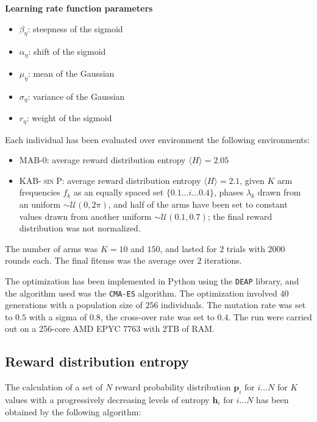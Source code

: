 \noindent \textbf{Learning rate function parameters}
\begin{itemize}
    \item $\beta_{\eta}$: steepness of the sigmoid
    \item $\alpha_{\eta}$: shift of the sigmoid
    \item $\mu_{\eta}$: mean of the Gaussian
    \item $\sigma_{\eta}$: variance of the Gaussian
    \item $r_{\eta}$: weight of the sigmoid
\end{itemize}

\noindent Each individual has been evaluated over environment the following environments:

\begin{itemize}
    \item \textsc{MAB-0}: average reward distribution entropy $\langle H\rangle=2.05$
    \item \textsc{KAB-$\sin$P}: average reward distribution entropy $\langle H\rangle=2.1$, given $K$ arm frequencies $f_{k}$ as an equally spaced set $\{0.1\ldots i\ldots 0.4\}$, phases $\lambda_{k}$ drawn from an uniform $\sim \mathcal{U}(0, 2\pi)$, and half of the arms have been set to constant values drawn from
        another uniform $\sim \mathcal{U}(0.1, 0.7)$; the final reward distribution was not normalized.
\end{itemize}

\noindent The number of arms was $K=10$ and $150$, and lasted for $2$ trials with $2000$ rounds each.
The final fitenss was the average over $2$ iterations.

\hfill \break
The optimization has been implemented in Python using the \texttt{DEAP} library, and the algorithm used was the \texttt{CMA-ES} algorithm. The optimization involved $40$ generations with a population size of $256$ individuals. The mutation rate was set to $0.5$ with a sigma of $0.8$, the cross-over rate was set to $0.4$.
The run were carried out on a 256-core AMD EPYC 7763 with 2TB of RAM.


\subsection{Reward distribution entropy}\label{sec:appendix_entropy}

\noindent The calculation of a set of $N$ reward probability distribution $\mathbf{p}_{i}\text{  for  } i\ldots N$ for $K$ values with a progressively decreasing levels of entropy $\mathbf{h}_{i}\text{  for  } i\ldots N$ has been obtained by the following algorithm:

